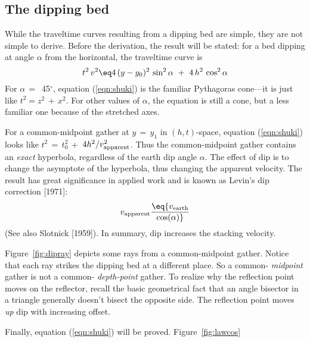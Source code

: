 \subsection{The dipping bed}
\par
While the traveltime curves resulting from a dipping bed are simple,
they are not simple to derive.
Before the derivation, the result will be stated:
for a bed dipping at angle  $\alpha$  from the horizontal,
the traveltime curve is
\begin{equation}
t^2 \, v^2  \eq 
4 \, (y - y_0 )^2 \, \sin^2  \alpha
\ +\ 
4 \, h^2 \, \cos^2  \alpha
\label{eqn:shuki}
\end{equation}
For $\alpha \,=\,$ 45$^\circ$,
equation (\ref{eqn:shuki}) is the familiar Pythagoras cone---it
is just like  $t^2 = z^2 \,+\, x^2 $.
For other values of  $\alpha$,  the equation is still a cone,
but a less familiar one because of the stretched axes.
\par
For a common-midpoint gather at  $y\,=\, y_1$  in $(h,t)$-space,
equation (\ref{eqn:shuki}) looks
like  $t^2 \,=\, t_0^2 \,+$
$4h^2 / v_{\rm apparent}^2$.
Thus the common-midpoint gather contains an
{\em  exact}
hyperbola, regardless of the earth dip angle  $\alpha$.
The effect of dip is to change the asymptote of the hyperbola,
thus changing the apparent velocity.
The result has great significance in applied work and is
known as Levin's dip correction [1971]:
\begin{equation}
v_{\rm apparent}  \eq  {v_{\rm earth}  \over  \cos ( \alpha ) }
\label{eqn:2.2}
\end{equation}
(See also Slotnick [1959]).
In summary, dip increases the stacking velocity.
\par
Figure~\ref{fig:dipray} depicts some rays from a common-midpoint gather.
Notice that each ray strikes the dipping bed at a different place.
So a common-%
{\em  midpoint %
} gather is not a common-%
{\em  depth-point %
} gather.
To realize why the reflection point moves on the reflector,
recall the basic geometrical fact that an
angle bisector in a triangle generally doesn't bisect the opposite side.
The reflection point moves
{\em  up}
dip with increasing offset.
\par
Finally, equation (\ref{eqn:shuki}) will be proved.
Figure~\ref{fig:lawcos}
